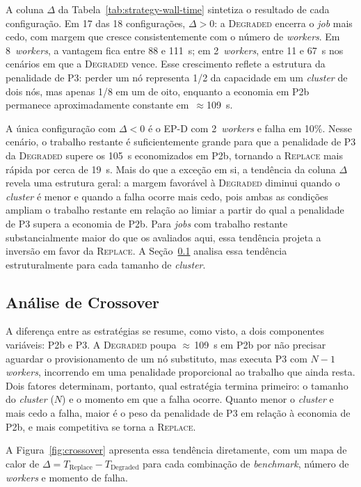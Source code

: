 A coluna $\Delta$ da Tabela~\ref{tab:strategy-wall-time} sintetiza o resultado de
cada configuração. Em 17 das 18 configurações, $\Delta > 0$: a \textsc{Degraded}
encerra o \textit{job} mais cedo, com margem que cresce consistentemente com o
número de \textit{workers}. Em 8~\textit{workers}, a vantagem fica entre 88 e
111~s; em 2~\textit{workers}, entre 11 e 67~s nos cenários em que a
\textsc{Degraded} vence. Esse crescimento reflete a estrutura da penalidade de P3:
perder um nó representa 1/2 da capacidade em um \textit{cluster} de dois nós, mas
apenas 1/8 em um de oito, enquanto a economia em P2b permanece aproximadamente
constante em~$\approx$109~s.

A única configuração com $\Delta < 0$ é o EP-D com 2~\textit{workers} e falha em
10\%. Nesse cenário, o trabalho restante é suficientemente grande para que a
penalidade de P3 da \textsc{Degraded} supere os 105~s economizados em P2b, tornando
a \textsc{Replace} mais rápida por cerca de 19~s. Mais do que a exceção em si, a
tendência da coluna $\Delta$ revela uma estrutura geral: a margem favorável à
\textsc{Degraded} diminui quando o \textit{cluster} é menor e quando a falha ocorre
mais cedo, pois ambas as condições ampliam o trabalho restante em relação ao limiar
a partir do qual a penalidade de P3 supera a economia de P2b. Para \textit{jobs}
com trabalho restante substancialmente maior do que os avaliados aqui, essa tendência
projeta a inversão em favor da \textsc{Replace}. A Seção~\ref{sec:crossover}
analisa essa tendência estruturalmente para cada tamanho de \textit{cluster}.

\subsection{Análise de Crossover}
\label{sec:crossover}

A diferença entre as estratégias se resume, como visto, a dois componentes variáveis:
P2b e P3. A \textsc{Degraded} poupa $\approx$\,109~s em P2b por não precisar aguardar
o provisionamento de um nó substituto, mas executa P3 com $N{-}1$ \textit{workers},
incorrendo em uma penalidade proporcional ao trabalho que ainda resta. Dois fatores
determinam, portanto, qual estratégia termina primeiro: o tamanho do \textit{cluster}
($N$) e o momento em que a falha ocorre. Quanto menor o \textit{cluster} e mais cedo
a falha, maior é o peso da penalidade de P3 em relação à economia de P2b, e mais
competitiva se torna a \textsc{Replace}.

A Figura~\ref{fig:crossover} apresenta essa tendência diretamente, com um mapa de
calor de $\Delta = T_{\text{Replace}} - T_{\text{Degraded}}$ para cada combinação de
\textit{benchmark}, número de \textit{workers} e momento de falha.

